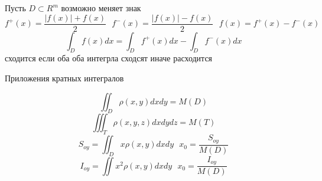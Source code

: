 \begin{theorem}
  Пусть $D \subset R^m$ возможно меняет знак
  $$
  f^+(x) = \frac{|f(x)| + f(x)}{2} ~~~
  f^-(x) = \frac{|f(x)| - f(x)}{2} ~~~
  f(x) = f^+(x) - f^-(x)
  $$
  $$
  \int_D f(x) dx = \int_D f^+(x) dx - \int_D f^-(x)dx
  $$
  сходится если оба оба интегрла сходсят иначе расходится
\end{theorem}

\begin{title}[\Large]
  Приложения кратных интегралов
\end{title}
$$
\iint_D \rho(x,y) dx dy = M(D)
$$
$$
\iiint_T \rho(x,y,z) dx dy dz = M(T)
$$
$$
S_{oy} = \iint_D x \rho(x,y) dx dy ~~~ x_0 = \frac{S_{oy}}{M(D)}
$$
$$
I_{oy} = \iint x^2 \rho(x,y)dx dy ~~~ x_0 = \frac{I_{oy}}{M(D)}
$$
